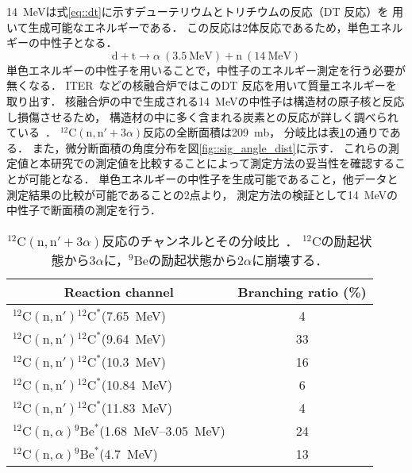 \documentclass[../master]{subfiles}
\begin{document}
\SI{14}{\mega\electronvolt}は式\eqref{eq::dt}に示すデューテリウムとトリチウムの反応（DT 反応）を
用いて生成可能なエネルギーである．
この反応は2体反応であるため，単色エネルギーの中性子となる．
\begin{equation}
  \mathrm{d} + \mathrm{t} \rightarrow \alpha\ (\SI{3.5}{\mega\electronvolt}) + \mathrm{n}\ (\SI{14}{\mega\electronvolt})
  \label{eq::dt}
\end{equation}
単色エネルギーの中性子を用いることで，中性子のエネルギー測定を行う必要が無くなる．
ITER~\cite{iter}などの核融合炉ではこのDT 反応を用いて質量エネルギーを取り出す．
核融合炉の中で生成される\SI{14}{\mega\electronvolt}の中性子は構造材の原子核と反応し損傷させるため，
構造材の中に多く含まれる炭素との反応が詳しく調べられている~\cite{takahashietal,kondoetal}．
${}^{12}\mathrm{C}(\mathrm{n},\mathrm{n}'+3\alpha)$反応の全断面積は\SI{209}{\milli\barn}，
分岐比は表\ref{tab::branchingratio}の通りである．
また，微分断面積の角度分布を図\ref{fig::sig_angle_dist}に示す．
これらの測定値と本研究での測定値を比較することによって測定方法の妥当性を確認することが可能となる．
単色エネルギーの中性子を生成可能であること，他データと測定結果の比較が可能であることの2点より，
測定方法の検証として\SI{14}{\mega\electronvolt}の中性子で断面積の測定を行う．

\begin{table}
  \centering
  \caption[${}^{12}\mathrm{C}(\mathrm{n},\mathrm{n}'+3\alpha)$反応のチャンネルとその分岐比．]
          {${}^{12}\mathrm{C}(\mathrm{n},\mathrm{n}'+3\alpha)$反応のチャンネルとその分岐比~\cite{kondoetal}．
            ${}^{12}\mathrm{C}$の励起状態から$3\alpha$に，${}^{9}\mathrm{Be}$の励起状態から$2\alpha$に崩壊する．}
  \label{tab::branchingratio}
  \begin{tabular}{lc}
    \toprule
    \multicolumn{1}{c}{Reaction channel} & Branching ratio (\%)\\
    \midrule
    ${}^{12}\mathrm{C}(\mathrm{n},\mathrm{n}'){}^{12}\mathrm{C}^{*}$(\SI{7.65}{\mega\electronvolt}) & 4\\
    ${}^{12}\mathrm{C}(\mathrm{n},\mathrm{n}'){}^{12}\mathrm{C}^{*}$(\SI{9.64}{\mega\electronvolt}) & 33\\
    ${}^{12}\mathrm{C}(\mathrm{n},\mathrm{n}'){}^{12}\mathrm{C}^{*}$(\SI{10.3}{\mega\electronvolt}) & 16\\
    ${}^{12}\mathrm{C}(\mathrm{n},\mathrm{n}'){}^{12}\mathrm{C}^{*}$(\SI{10.84}{\mega\electronvolt}) & 6\\
    ${}^{12}\mathrm{C}(\mathrm{n},\mathrm{n}'){}^{12}\mathrm{C}^{*}$(\SI{11.83}{\mega\electronvolt}) & 4\\
    ${}^{12}\mathrm{C}(\mathrm{n},\alpha){}^{9}\mathrm{Be}^{*}$(\SIrange{1.68}{3.05}{\mega\electronvolt}) & 24\\
    ${}^{12}\mathrm{C}(\mathrm{n},\alpha){}^{9}\mathrm{Be}^{*}$(\SI{4.7}{\mega\electronvolt}) & 13\\
    \bottomrule
  \end{tabular}
\end{table}
\end{document}
